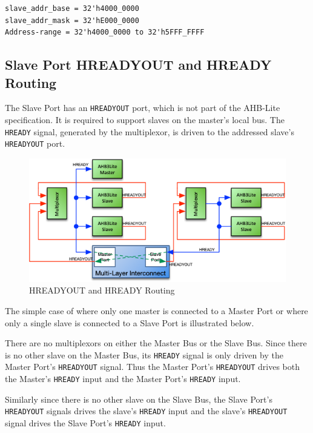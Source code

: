 \begin{verbatim}
slave_addr_base = 32'h4000_0000
slave_addr_mask = 32'hE000_0000
Address-range = 32'h4000_0000 to 32'h5FFF_FFFF
\end{verbatim}

\subsection{Slave Port HREADYOUT and HREADY
Routing}\label{slave-port-hreadyout-and-hready-routing}

The Slave Port has an \texttt{HREADYOUT} port, which is not part of the AHB-Lite
specification. It is required to support slaves on the master's local
bus. The \texttt{HREADY} signal, generated by the multiplexor, is driven to the
addressed slave's \texttt{HREADYOUT} port.

\begin{figure}[thb]
	\includegraphics[]{assets/img/ahb-lite-switch-sys4}
	\caption{HREADYOUT and HREADY Routing}
	\label{fig:hready-hready-routing}
\end{figure}

The simple case of where only one master is connected to a Master Port
or where only a single slave is connected to a Slave Port is illustrated
below.

There are no multiplexors on either the Master Bus or the Slave Bus.
Since there is no other slave on the Master Bus, its \texttt{HREADY} signal is
only driven by the Master Port's \texttt{HREADYOUT} signal. Thus the Master
Port's \texttt{HREADYOUT} drives both the Master's \texttt{HREADY} input and the Master
Port's \texttt{HREADY} input.

Similarly since there is no other slave on the Slave Bus, the Slave
Port's \texttt{HREADYOUT} signals drives the slave's \texttt{HREADY} input and the slave's
\texttt{HREADYOUT} signal drives the Slave Port's \texttt{HREADY} input.

